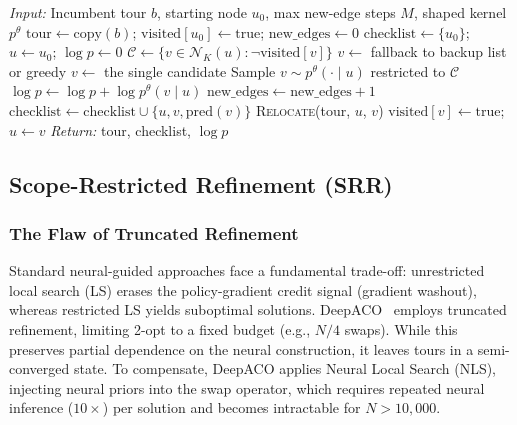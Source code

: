 \documentclass[sigconf,nonacm]{acmart}
\begin{document}
\begin{algorithm}[h]
\caption{Perturbation-Based Ant Construction}
\label{alg:perturbation-app}
\begin{algorithmic}[1]
\STATE \emph{Input:} Incumbent tour $b$, starting node $u_0$, max new-edge steps $M$, shaped kernel $p^\theta$
\STATE $\text{tour} \leftarrow \text{copy}(b)$; $\text{visited}[u_0] \leftarrow \text{true}$; $\text{new\_edges} \leftarrow 0$
\STATE $\text{checklist} \leftarrow \{u_0\}$; $u \leftarrow u_0$; $\log p \leftarrow 0$
    \STATE $\mathcal{C} \leftarrow \{v \in \mathcal{N}_K(u) : \neg\text{visited}[v]\}$ 
        \STATE $v \leftarrow$ fallback to backup list or greedy
        \STATE $v \leftarrow$ the single candidate 
    \ELSE
        \STATE Sample $v \sim p^\theta(\cdot \mid u)$ restricted to $\mathcal{C}$
        \STATE $\log p \leftarrow \log p + \log p^\theta(v \mid u)$
    \ENDIF
     
        \STATE $\text{new\_edges} \leftarrow \text{new\_edges} + 1$
        \STATE $\text{checklist} \leftarrow \text{checklist} \cup \{u, v, \text{pred}(v)\}$
    \ENDIF
    \STATE \textsc{Relocate}(tour, $u$, $v$) 
    \STATE $\text{visited}[v] \leftarrow \text{true}$; $u \leftarrow v$
\ENDWHILE
\STATE \emph{Return:} tour, checklist, $\log p$
\end{algorithmic}
\end{algorithm}

\subsection{Scope-Restricted Refinement (SRR)}
\label{app:credit}

\subsubsection{The Flaw of Truncated Refinement}
Standard neural-guided approaches face a fundamental trade-off: unrestricted local search (LS) erases the policy-gradient credit signal (gradient washout), whereas restricted LS yields suboptimal solutions.
DeepACO~\cite{deepaco} employs truncated refinement, limiting 2-opt to a fixed budget (e.g., $N/4$ swaps).
While this preserves partial dependence on the neural construction, it leaves tours in a semi-converged state.
To compensate, DeepACO applies Neural Local Search (NLS), injecting neural priors into the swap operator, which requires repeated neural inference ($10{\times}$) per solution and becomes intractable for $N > 10{,}000$.
\end{document}
